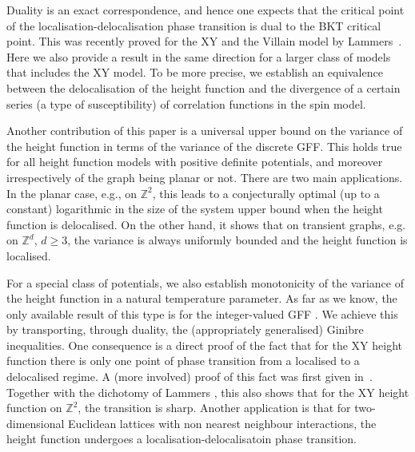 \documentclass[11pt, reqno]{amsart}
\numberwithin{equation}{section}
\theoremstyle{definition}
\theoremstyle{remark}
\newcommand{\ZZ}{\mathbb{Z}}
\begin{document}
Duality is an exact correspondence, and hence one expects that the critical point of the localisation-delocalisation phase transition is dual to the BKT critical point.
This was recently proved for the XY and the Villain model by Lammers~\cite{Lam23}. Here we also provide a result in the same direction for a larger class of models that includes the XY model. 
To be more precise, we establish an equivalence between the delocalisation of the height function and the divergence of a certain series (a type of susceptibility) of correlation functions in the spin model.

 
 Another contribution of this paper is a universal upper bound on the variance of the height function in terms of the variance of the discrete GFF. This holds true for all height function models with positive definite potentials, and moreover irrespectively of the graph being planar or not. 
There are two main applications. In the planar case, e.g., on $\mathbb Z^2$, this leads to a conjecturally optimal (up to a constant) logarithmic in the size of the system upper bound 
when the height function is delocalised. On the other hand, it shows that on transient graphs, e.g. on $\mathbb Z^d$, $d\geq 3$, the variance is always uniformly bounded and the height function is localised.

For a special class of potentials, we also establish monotonicity of the variance of the height function in a natural temperature parameter. 
As far as we know, the only available result of this type is for the integer-valued GFF \cite{KP}. 
We achieve {this} by transporting, through duality, the (appropriately generalised) Ginibre inequalities. 
One consequence is a direct proof of the fact that for the XY height function 
there is only one point of phase transition from a localised to a delocalised regime. 
A (more involved) proof of this fact was first given in~\cite{Lam23}.
Together with the dichotomy of Lammers \cite{Lammers22}, this also shows that for the XY height function on $\ZZ^2$, the transition is sharp.
Another application is that for two-dimensional Euclidean lattices with non nearest neighbour interactions, 
the height function undergoes a localisation-delocalisatoin phase transition.
  
\end{document}
